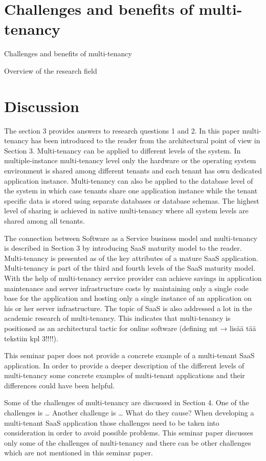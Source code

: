 \documentclass[conference]{sasmoota2017}
\begin{document}
\section{Challenges and benefits of multi-tenancy}

Challenges and benefits of multi-tenancy

Overview of the research field

\section{Discussion}

The section 3 provides answers to research questions 1 and 2. In this paper multi-tenancy has been introduced to the reader from the architectural point of view in Section 3. Multi-tenancy can be applied to different levels of the system. In multiple-instance multi-tenancy level only the hardware or the operating system environment is shared among different tenants and each tenant has own dedicated application instance. Multi-tenancy can also be applied to the database level of the system in which case tenants share one application instance while the tenant specific data is stored using separate databases or database schemas. The highest level of sharing is achieved in native multi-tenancy where all system levels are shared among all tenants. 

The connection between Software as a Service business model and multi-tenancy is described in Section 3 by introducing SaaS maturity model to the reader. Multi-tenancy is presented as of the key attributes of a mature SaaS application. Multi-tenancy is part of the third and fourth levels of the SaaS maturity model. With the help of multi-tenancy service provider can achieve savings in application maintenance and server infrastructure costs by maintaining only a single code base for the application and hosting only a single instance of an application on his or her server infrastructure. The topic of SaaS is also addressed a lot in the academic research of multi-tenancy. This indicates that multi-tenancy is positioned as an architectural tactic for online software (defining mt → lisää tää tekstiin kpl 3!!!!).

This seminar paper does not provide a concrete example of a multi-tenant SaaS application. In order to provide a deeper description of the different levels of multi-tenancy some concrete examples of multi-tenant applications and their differences could have been helpful. 

Some of the challenges of multi-tenancy are discussed in Section 4. One of the challenges is … Another challenge is … What do they cause? When developing a multi-tenant SaaS application those challenges need to be taken into consideration in order to avoid possible problems. This seminar paper discusses only some of the challenges of multi-tenancy and there can be other challenges which are not mentioned in this seminar paper.
\end{document}
